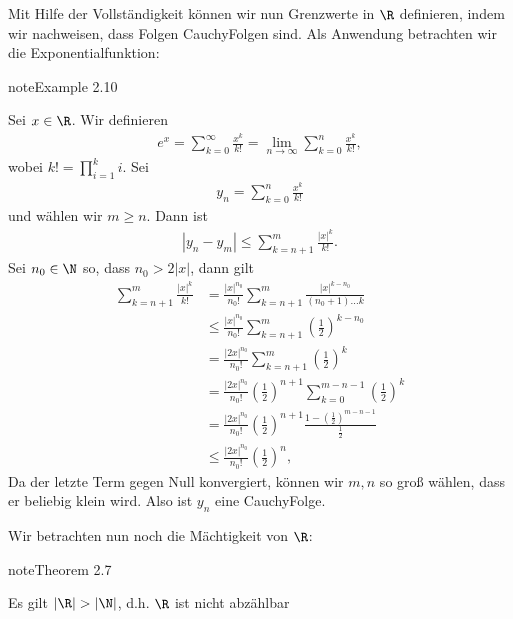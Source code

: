 \documentclass[letterpaper,10pt,english]{jupyterBook}
\begin{document}
Mit Hilfe der Vollständigkeit können wir nun Grenzwerte in \(\R\) definieren, indem wir nachweisen, dass Folgen Cauchy\sphinxhyphen{}Folgen sind. Als Anwendung betrachten wir die Exponentialfunktion:
\label{grundlagen/zahlensysteme:example-25}
\begin{sphinxadmonition}{note}{Example 2.10}



Sei \(x \in \R\). Wir definieren
\begin{equation*}
\begin{split} e^x = \sum_{k=0}^\infty \frac{x^k}{k!} = \lim_{n \rightarrow \infty} \sum_{k=0}^n \frac{x^k}{k!},\end{split}
\end{equation*}
wobei \(k! = \prod_{i=1}^k i\). Sei
\begin{equation*}
\begin{split}y_n = \sum_{k=0}^n \frac{x^k}{k!}\end{split}
\end{equation*}
und wählen wir \(m \geq n\). Dann ist
\begin{equation*}
\begin{split}|y_n - y_m| \leq \sum_{k=n+1}^m \frac{|x|^k}{k!}.\end{split}
\end{equation*}
Sei \(n_0 \in \N\) so, dass \(n_0 > 2{|x|} \), dann gilt
\begin{align*}
\sum_{k=n+1}^m \frac{|x|^k}{k!} &= \frac{|x|^{n_0}}{n_0!} \sum_{k=n+1}^m \frac{|x|^{k-n_0}}{(n_0+1)\ldots k} \\
&\leq \frac{|x|^{n_0}}{n_0!} \sum_{k=n+1}^m \left(\frac{1}2\right)^{k-n_0} \\
&= \frac{|2x|^{n_0}}{n_0!} \sum_{k=n+1}^m \left(\frac{1}2\right)^{k} \\
&= \frac{|2x|^{n_0}}{n_0!} \left(\frac{1}2\right)^{n+1} \sum_{k=0}^{m-n-1} \left(\frac{1}2\right)^{k} \\
&= \frac{|2x|^{n_0}}{n_0!} \left(\frac{1}2\right)^{n+1} \frac{1-\left(\frac{1}2\right)^{m-n-1}}{\frac{1}2} \\
&\leq \frac{|2x|^{n_0}}{n_0!} \left(\frac{1}2\right)^{n},
\end{align*}
Da der letzte Term gegen Null konvergiert, können wir \(m,n\) so groß wählen, dass er beliebig klein wird. Also ist \(y_n\) eine Cauchy\sphinxhyphen{}Folge.
\end{sphinxadmonition}

Wir betrachten nun noch die Mächtigkeit von \(\R\):
\label{grundlagen/zahlensysteme:theorem-26}
\begin{sphinxadmonition}{note}{Theorem 2.7}



Es gilt \(|\R| > |\N|\), d.h. \(\R\) ist nicht abzählbar
\end{sphinxadmonition}
\end{document}
